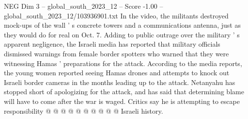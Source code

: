 \begin{textsample}{NEG Dim 3 – global\_south\_2023\_12 – Score -1.00 – global\_south\_2023\_12/103936901.txt}
In the video, the militants destroyed mock-ups of the wall ' s concrete towers and a communications antenna, just as they would do for real on Oct. 7.
Adding to public outrage over the military ' s apparent negligence, the Israeli media has reported that military officials dismissed warnings from female border spotters who warned that they were witnessing Hamas ' preparations for the attack.
According to the media reports, the young women reported seeing Hamas drones and attempts to knock out Israeli border cameras in the months leading up to the attack.
Netanyahu has stopped short of apologizing for the attack, and has said that determining blame will have to come after the war is waged.
Critics say he is attempting to escape responsibility @ @ @ @ @ @ @ @ @ @ Israeli history.

\end{textsample}
